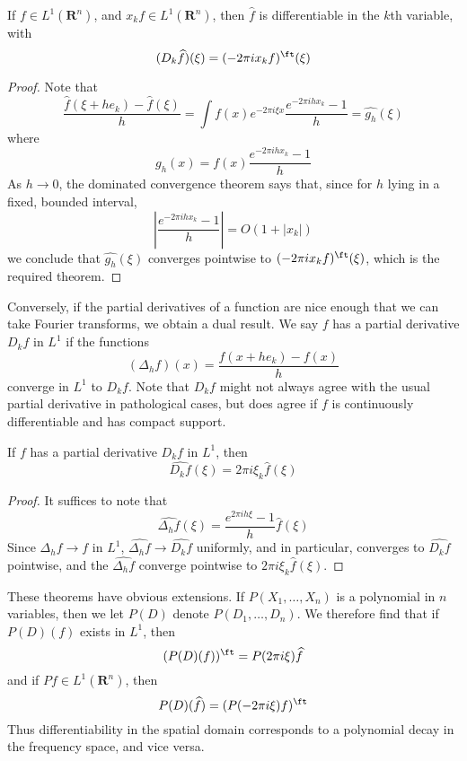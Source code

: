 \begin{theorem}
	If $f \in L^1(\mathbf{R}^n)$, and $x_k f \in L^1(\mathbf{R}^n)$, then $\widehat{f}$ is differentiable in the $k$th variable, with
	\[ (D_k \widehat{f})(\xi) = (- 2 \pi i x_k f)^\ft(\xi) \]
\end{theorem}
\begin{proof}
	Note that
	\[ \frac{\widehat{f}(\xi + h e_k) - \widehat{f}(\xi)}{h} = \int f(x) e^{- 2 \pi i \xi x} \frac{e^{-2 \pi i h x_k} - 1}{h} = \widehat{g_h}(\xi) \]
	where
	\[ g_h(x) = f(x) \frac{e^{- 2 \pi i h x_k} - 1}{h} \]
	As $h \to 0$, the dominated convergence theorem says that, since for $h$ lying in a fixed, bounded interval,
	\[ \left| \frac{e^{-2 \pi i h x_k} - 1}{h} \right| = O(1 + |x_k|) \]
	we conclude that $\widehat{g_h}(\xi)$ converges pointwise to $(-2 \pi i x_k f)^\ft(\xi)$, which is the required theorem.
\end{proof}

Conversely, if the partial derivatives of a function are nice enough that we can take Fourier transforms, we obtain a dual result. We say $f$ has a partial derivative $D_k f$ in $L^1$ if the functions
%
\[ (\Delta_h f)(x) = \frac{f(x + h e_k) - f(x)}{h} \]
%
converge in $L^1$ to $D_k f$. Note that $D_k f$ might not always agree with the usual partial derivative in pathological cases, but does agree if $f$ is continuously differentiable and has compact support.

\begin{theorem}
	If $f$ has a partial derivative $D_k f$ in $L^1$, then
	\[ \widehat{D_k f}(\xi) = 2 \pi i \xi_k \widehat{f}(\xi) \]
\end{theorem}
\begin{proof}
	It suffices to note that
	\[ \widehat{\Delta_h f}(\xi) = \frac{e^{2 \pi i h \xi} - 1}{h} \widehat{f}(\xi) \]
	Since $\Delta_h f \to f$ in $L^1$, $\widehat{\Delta_h f} \to \widehat{D_k f}$ uniformly, and in particular, converges to $\widehat{D_k f}$ pointwise, and the $\widehat{\Delta_h f}$ converge pointwise to $2 \pi i \xi_k \widehat{f}(\xi)$.
\end{proof}

These theorems have obvious extensions. If $P(X_1, \dots, X_n)$ is a polynomial in $n$ variables, then we let $P(D)$ denote $P(D_1, \dots, D_n)$. We therefore find that if $P(D)(f)$ exists in $L^1$, then
%
\[ (P(D)(f))^\ft = P(2 \pi i \xi) \widehat{f} \]
%
and if $Pf \in L^1(\mathbf{R}^n)$, then
%
\[ P(D)(\widehat{f}) = (P(-2 \pi i \xi) f)^\ft \]
%
Thus differentiability in the spatial domain corresponds to a polynomial decay in the frequency space, and vice versa.

